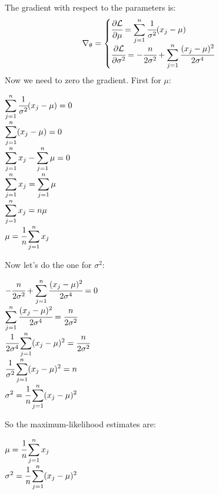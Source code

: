 The gradient with respect to the parameters is:
\[\nabla_\theta=
\begin{cases}
	\cfrac{\partial\mathcal{L}}{\partial\mu}=\displaystyle\sum_{j=1}^n\cfrac{1}{\sigma^2}(x_j-\mu)\\
	\cfrac{\partial\mathcal{L}}{\partial\sigma^2}=-\cfrac{n}{2\sigma^2}+\displaystyle\sum_{j=1}^n\cfrac{(x_j-\mu)^2}{2\sigma^4}\\
\end{cases}
\]
Now we need to zero the gradient. First for $\mu$:
\begin{center}
	$\displaystyle \displaystyle\sum_{j=1}^n\cfrac{1}{\sigma^2}(x_j-\mu)=0$\\
	$\displaystyle \displaystyle\sum_{j=1}^n(x_j-\mu)=0$\\
	$\displaystyle \displaystyle\sum_{j=1}^nx_j-\displaystyle\sum_{j=1}^n\mu=0$\\
	$\displaystyle \displaystyle\sum_{j=1}^nx_j=\displaystyle\sum_{j=1}^n\mu$\\
	$\displaystyle \displaystyle\sum_{j=1}^nx_j=n\mu$	\\
	$\displaystyle \mu=\cfrac{1}{n}\displaystyle\sum_{j=1}^nx_j$	
\end{center}
Now let's do the one for $\sigma^2$:
\begin{center}
	$\displaystyle -\cfrac{n}{2\sigma^2}+\displaystyle\sum_{j=1}^n\cfrac{(x_j-\mu)^2}{2\sigma^4}=0$\\
	$\displaystyle \displaystyle\sum_{j=1}^n\cfrac{(x_j-\mu)^2}{2\sigma^4}=\cfrac{n}{2\sigma^2}$\\
	$\displaystyle \cfrac{1}{2\sigma^4}\displaystyle\sum_{j=1}^n(x_j-\mu)^2=\cfrac{n}{2\sigma^2}$\\
	$\displaystyle \cfrac{1}{\sigma^2}\displaystyle\sum_{j=1}^n(x_j-\mu)^2=n$\\
	$\displaystyle \sigma^2=\cfrac{1}{n}\displaystyle\sum_{j=1}^n(x_j-\mu)^2$\\
\end{center}
So the maximum-likelihood estimates are:
\begin{center}
	$\displaystyle \mu=\cfrac{1}{n}\displaystyle\sum_{j=1}^nx_j$\\
	\vspace{0.3cm}
	$\displaystyle \sigma^2=\cfrac{1}{n}\displaystyle\sum_{j=1}^n(x_j-\mu)^2$
\end{center}
